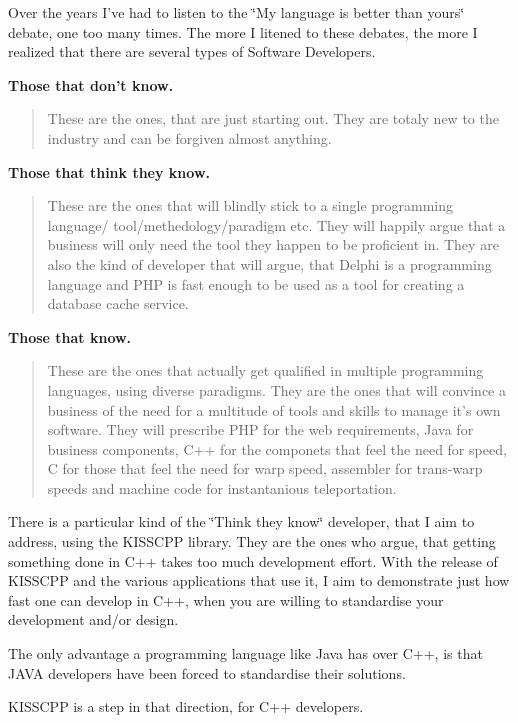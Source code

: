 Over the years I've had to listen to the \char`\"{}\-My language is better than yours\char`\"{} debate, one too many times. The more I litened to these debates, the more I realized that there are several types of Software Developers.


\begin{DoxyEnumerate}
\item {\bfseries Those that don't know.} \begin{quotation}
These are the ones, that are just starting out. They are totaly new to the industry and can be forgiven almost anything.

\end{quotation}

\item {\bfseries Those that think they know.} \begin{quotation}
These are the ones that will blindly stick to a single programming language/ tool/methedology/paradigm etc. They will happily argue that a business will only need the tool they happen to be proficient in. They are also the kind of developer that will argue, that Delphi is a programming language and P\-H\-P is fast enough to be used as a tool for creating a database cache service.

\end{quotation}

\item {\bfseries Those that know.} \begin{quotation}
These are the ones that actually get qualified in multiple programming languages, using diverse paradigms. They are the ones that will convince a business of the need for a multitude of tools and skills to manage it's own software. They will prescribe P\-H\-P for the web requirements, Java for business components, C++ for the componets that feel the need for speed, C for those that feel the need for warp speed, assembler for trans-\/warp speeds and machine code for instantanious teleportation.

\end{quotation}

\end{DoxyEnumerate}

There is a particular kind of the \char`\"{}\-Think they know\char`\"{} developer, that I aim to address, using the K\-I\-S\-S\-C\-P\-P library. They are the ones who argue, that getting something done in C++ takes too much development effort. With the release of K\-I\-S\-S\-C\-P\-P and the various applications that use it, I aim to demonstrate just how fast one can develop in C++, when you are willing to standardise your development and/or design.

The only advantage a programming language like Java has over C++, is that J\-A\-V\-A developers have been forced to standardise their solutions.

K\-I\-S\-S\-C\-P\-P is a step in that direction, for C++ developers. 